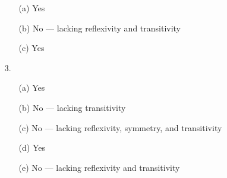 \documentclass{article}
\begin{document}
\begin{enumerate}
        \begin{itemize}
            \item[(a)] Yes
            \item[(b)] No --- lacking reflexivity and transitivity
            \item[(c)] Yes
        \end{itemize}
    \item[3.]
        \begin{itemize}
            \item[(a)] Yes
            \item[(b)] No --- lacking transitivity
            \item[(c)] No --- lacking reflexivity, symmetry, and transitivity
            \item[(d)] Yes
            \item[(e)] No --- lacking reflexivity and transitivity
        \end{itemize}
\end{enumerate}
\end{document}

